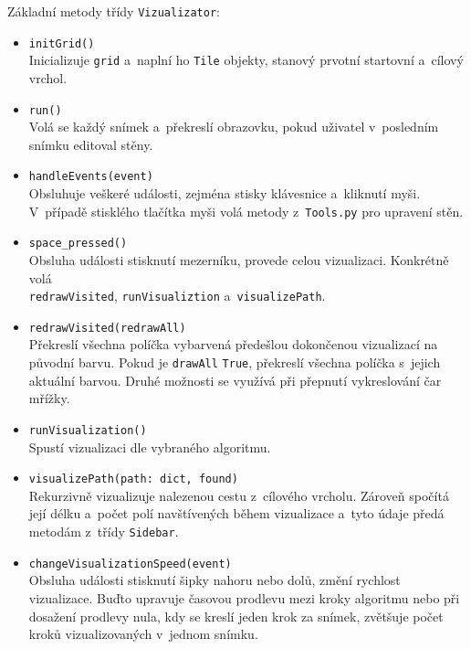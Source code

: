 \documentclass[12pt]{report}			%
\begin{document}
			Základní metody třídy \texttt{Vizualizator}:
			\begin{itemize}
			\setlength\itemsep{0.01mm}
			\item \texttt{initGrid()}\\
			Inicializuje \texttt{grid} a~naplní ho \texttt{Tile} objekty, stanový prvotní startovní a~cílový vrchol.
\item \texttt{run()}\\
Volá se každý snímek a~překreslí obrazovku, pokud uživatel v~posledním snímku editoval stěny.
\item \texttt{handleEvents(event)}\\
Obsluhuje veškeré události, zejména stisky klávesnice a~kliknutí myši. V~případě stisklého tlačítka myši volá metody z~\texttt{Tools.py} pro upravení stěn.

\item \texttt{space\_pressed()}\\
Obsluha události stisknutí mezerníku, provede celou vizualizaci. Konkrétně volá \\ \texttt{redrawVisited}, \texttt{runVisualiztion} a~\texttt{visualizePath}.

\item \texttt{redrawVisited(redrawAll)}\\
Překreslí všechna políčka vybarvená předešlou dokončenou vizualizací na původní barvu. Pokud je \texttt{drawAll} \texttt{True}, překreslí všechna políčka s~jejich aktuální barvou. Druhé možnosti se využívá při přepnutí vykreslování čar mřížky.
\item \texttt{runVisualization()}\\
Spustí vizualizaci dle vybraného algoritmu.

\item \texttt{visualizePath(path: dict, found)}\\
Rekurzivně vizualizuje nalezenou cestu z~cílového vrcholu. Zároveň spočítá její délku a~počet polí navštívených během vizualizace a~tyto údaje předá metodám z~třídy \texttt{Sidebar}.


\item \texttt{changeVisualizationSpeed(event)}\\
Obsluha události stisknutí šipky nahoru nebo dolů, změní rychlost vizualizace. Buďto upravuje časovou prodlevu mezi kroky algoritmu nebo při dosažení prodlevy nula, kdy se kreslí jeden krok za snímek, zvětšuje počet kroků vizualizovaných v~jednom snímku.

\end{itemize}
\end{document}
